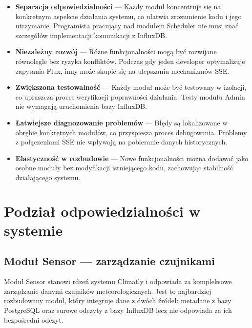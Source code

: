 \documentclass[a4paper,12pt,openany]{book}
\begin{document}
\begin{itemize}[itemsep=3pt,topsep=5pt,parsep=0pt]
\item \textbf{Separacja odpowiedzialności} --- Każdy moduł koncentruje się na konkretnym aspekcie działania systemu, co ułatwia zrozumienie kodu i jego utrzymanie. Programista pracujący nad modułem Scheduler nie musi znać szczegółów implementacji komunikacji z InfluxDB.

\item \textbf{Niezależny rozwój} --- Różne funkcjonalności mogą być rozwijane równolegle bez ryzyka konfliktów. Podczas gdy jeden developer optymalizuje zapytania Flux, inny może skupić się na ulepszaniu mechanizmów SSE.

\item \textbf{Zwiększona testowalność} --- Każdy moduł może być testowany w izolacji, co upraszcza proces weryfikacji poprawności działania. Testy modułu Admin nie wymagają uruchomienia bazy InfluxDB.

\item \textbf{Łatwiejsze diagnozowanie problemów} --- Błędy są lokalizowane w obrębie konkretnych modułów, co przyspiesza proces debugowania. Problemy z połączeniami SSE nie wpływają na pobieranie danych historycznych.

\item \textbf{Elastyczność w rozbudowie} --- Nowe funkcjonalności można dodawać jako osobne moduły bez modyfikacji istniejącego kodu, zachowując stabilność działającego systemu.
\end{itemize}

\section{Podział odpowiedzialności w systemie}

\subsection{Moduł Sensor --- zarządzanie czujnikami}
Moduł Sensor stanowi rdzeń systemu Climatly i odpowiada za kompleksowe zarządzanie danymi czujników meteorologicznych. Jest to najbardziej rozbudowany moduł, który integruje dane z dwóch źródeł: metadane z bazy PostgreSQL oraz surowe odczyty z bazy InfluxDB lecz nie odpowiada za ich bezpośredni odczyt.
\end{document}
